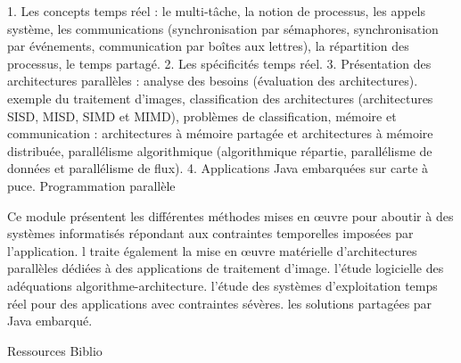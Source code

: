 {
1.	Les concepts temps réel : le multi-tâche, la notion de processus, les appels système, les communications (synchronisation par sémaphores, synchronisation par événements, communication par boîtes aux lettres), la répartition des processus, le temps partagé.
2.	Les spécificités temps réel.
3.	Présentation des architectures parallèles : analyse des besoins (évaluation des architectures). exemple du traitement d'images, classification des architectures (architectures SISD, MISD, SIMD et MIMD), problèmes de classification, mémoire et communication : architectures à mémoire partagée et architectures à mémoire distribuée, parallélisme algorithmique (algorithmique répartie, parallélisme de données et parallélisme de flux).
4.	Applications Java embarquées sur carte à puce. 
} 
{Programmation parallèle} 
{\begin{itemize} 
\ObjItem Ce module présentent les différentes méthodes mises en \oe uvre pour aboutir à des systèmes informatisés répondant aux contraintes temporelles imposées par l'application.
\ObjItem l traite également
\ObjItem la mise en \oe uvre matérielle d'architectures parallèles dédiées à des applications de traitement d'image.
l'étude logicielle des adéquations algorithme-architecture.
l'étude des systèmes d'exploitation temps réel pour des applications avec contraintes sévères.
les solutions partagées par Java embarqué.
\end{itemize} 
} 
{Ressources} 
{Biblio} 
 
\vfill

